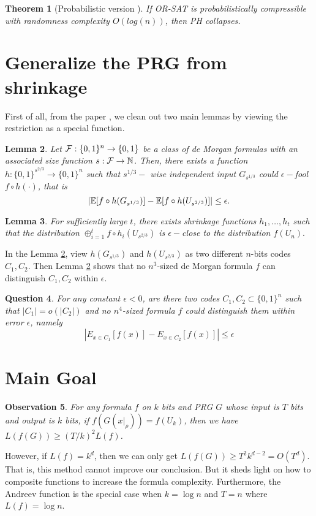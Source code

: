 \documentclass[12pt]{article}
\newtheorem{theorem}{Theorem}[section]
\newtheorem{lemma}[theorem]{Lemma}
\newtheorem{q}[theorem]{Question}
\newtheorem{ob}[theorem]{Observation}
\renewcommand{\.}{,\ldots,}
\begin{document}
\begin{theorem}[Probabilistic version \cite{fortnow2008infeasibility}]
If OR-SAT is probabilistically compressible with randomness complexity $O(log(n))$,
then PH collapses.
\end{theorem}

\section{Generalize the PRG from shrinkage}	

First of all, from the paper \cite{impagliazzo2012pseudorandomness}, we clean out two main lemmas by viewing the restriction as a special function. 
\begin{lemma}\label{main lemma for PRG from shrinkage}
Let $\mathcal{F}:\{0,1\}^n\rightarrow \{0,1\}$ be a class of de Morgan formulas with an associated size function $s:\mathcal{F} \rightarrow \mathbb{N}$. Then, there exists a function $h:\{0,1\}^{s^{2/3}}\rightarrow \{0,1\}^n$ such that $s^{1/3}-$ wise independent input $G_{s^{1/3}}$ could $\epsilon-$fool $f\circ h(\cdot )$, that is 
$$|\mathbb{E}[f\circ h(G_{s^{1/3}})]-\mathbb{E}[f\circ h(U_{s^{2/3}})]|\leq \epsilon.$$
\end{lemma}

\begin{lemma}
For sufficiently large $t$, there exists shrinkage functions $h_1\.h_t$ such that the distribution $\oplus_{i=1}^t f\circ h_i(U_{s^{2/3}})$ is $\epsilon-$close to the distribution $f(U_{n}).$
\end{lemma}

In the Lemma \ref{main lemma for PRG from shrinkage}, view $h(G_{s^{1/3}})$ and $h(U_{s^{2/3}})$ as two different $n$-bits codes $C_1,C_2$. Then Lemma \ref{main lemma for PRG from shrinkage} shows that no $n^3$-sized de Morgan formula $f$ can distinguish $C_1,C_2$ within $\epsilon$.

\begin{q}
For any constant $\epsilon<0$, are there two codes $C_1,C_2\subset \{0,1\}^n$ such that $|C_1|=o(|C_2|)$ and no $n^4$-sized formula $f$ could distinguish them within error $\epsilon$, namely 
$$|E_{x\in C_1}[f(x)]-E_{x\in C_2}[f(x)]|\leq \epsilon$$
\end{q}

\section{Main Goal}
\begin{ob}
	For any formula $f$ on $k$ bits and PRG $G$ whose input is $T$ bits and output is $k$ bits, if $f( G(x|_\rho))=f(U_k)$, then we have 
	$L(f (G))\geq (T/k)^2 L(f)$.
\end{ob}
However, if $L(f)=k^d$, then we can only get $L(f(G))\geq T^2k^{d-2}=O(T^d) $. That is, this method cannot improve our conclusion. But it sheds light on how to composite functions to increase the formula complexity.   Furthermore, the Andreev function is the special case when $k=\log n$ and $T=n$ where $L(f)=\log n$. 
\end{document}
